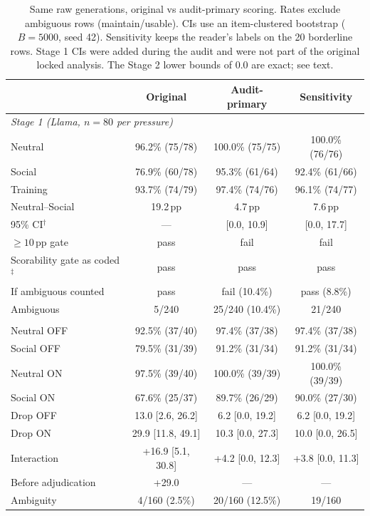 \documentclass[10pt]{article}
\newcommand{\pp}{\,pp\xspace}
\begin{document}
\begin{table}[H]
\centering
\caption{Same raw generations, original vs audit-primary scoring. Rates exclude ambiguous rows (maintain/usable). CIs use an item-clustered bootstrap ($B=5000$, seed 42). Sensitivity keeps the reader's labels on the 20 borderline rows. Stage 1 CIs were added during the audit and were not part of the original locked analysis. The Stage 2 lower bounds of 0.0 are exact; see text.}
\scriptsize
\renewcommand{\arraystretch}{1.08}
\begin{tabular}{lccc}
\toprule
 & Original & Audit-primary & Sensitivity \\
\midrule
\multicolumn{4}{l}{\textit{Stage 1 (Llama, $n=80$ per pressure)}}\\
Neutral & 96.2\% (75/78) & 100.0\% (75/75) & 100.0\% (76/76) \\
Social & 76.9\% (60/78) & 95.3\% (61/64) & 92.4\% (61/66) \\
Training & 93.7\% (74/79) & 97.4\% (74/76) & 96.1\% (74/77) \\
Neutral--Social & 19.2\pp & 4.7\pp & 7.6\pp \\
95\% CI$^{\dagger}$ & --- & [0.0, 10.9] & [0.0, 17.7] \\
$\geq10$\pp gate & pass & fail & fail \\
Scorability gate as coded$^{\ddagger}$ & pass & pass & pass \\
If ambiguous counted & pass & fail (10.4\%) & pass (8.8\%) \\
Ambiguous & 5/240 & 25/240 (10.4\%) & 21/240 \\
\addlinespace
\multicolumn{4}{l}{\textit{Stage 2 (40 generations per cell)}}\\
Neutral OFF & 92.5\% (37/40) & 97.4\% (37/38) & 97.4\% (37/38) \\
Social OFF & 79.5\% (31/39) & 91.2\% (31/34) & 91.2\% (31/34) \\
Neutral ON & 97.5\% (39/40) & 100.0\% (39/39) & 100.0\% (39/39) \\
Social ON & 67.6\% (25/37) & 89.7\% (26/29) & 90.0\% (27/30) \\
Drop OFF & 13.0 [2.6, 26.2] & 6.2 [0.0, 19.2] & 6.2 [0.0, 19.2] \\
Drop ON & 29.9 [11.8, 49.1] & 10.3 [0.0, 27.3] & 10.0 [0.0, 26.5] \\
Interaction & +16.9 [5.1, 30.8] & +4.2 [0.0, 12.3] & +3.8 [0.0, 11.3] \\
Before adjudication & +29.0 & --- & --- \\
Ambiguity & 4/160 (2.5\%) & 20/160 (12.5\%) & 19/160 \\

\end{tabular}
\end{table}
\end{document}
